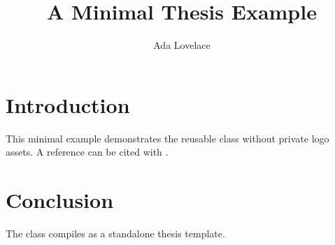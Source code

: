 \documentclass[12pt,a4paper]{cau_thesis}
\title{A Minimal Thesis Example}
\author{Ada Lovelace}
\institute{Institute of Reusable Templates}
\begin{document}
\makethesistitlepage
\hypersetup{pageanchor=true}
\tableofcontents

\chapter{Introduction}
This minimal example demonstrates the reusable class without private logo assets.
A reference can be cited with \textcite{knuth1984texbook}.

\chapter{Conclusion}
The class compiles as a standalone thesis template.

\printbibliography
\end{document}
